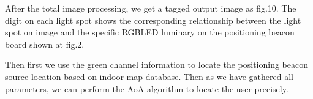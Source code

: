 \documentclass[conference]{IEEEtran}
\begin{document}
After the total image processing, we get a tagged output image as fig.10. The digit on each light spot shows the corresponding relationship between the light spot on image and the specific RGBLED luminary on the positioning beacon board shown at fig.2. 

Then first we use the green channel information to locate the positioning beacon source location based on indoor map database. Then as we have gathered all parameters, we can perform the AoA algorithm to locate the user precisely.

\begin{figure}
	\footnotesize
	\hspace{1cm}%
	
\end{figure}
\end{document}
